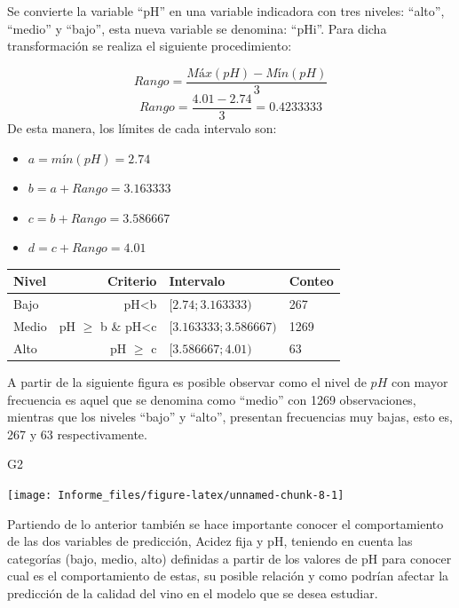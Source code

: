 \documentclass[
]{article}
\newenvironment{Shaded}{\begin{snugshade}}{\end{snugshade}}
\newcommand{\NormalTok}[1]{#1}
\providecommand{\tightlist}{%
  \setlength{\itemsep}{0pt}\setlength{\parskip}{0pt}}
\begin{document}
Se convierte la variable ``pH'' en una variable indicadora con tres
niveles: ``alto'', ``medio'' y ``bajo'', esta nueva variable se
denomina: ``pHi''. Para dicha transformación se realiza el siguiente
procedimiento:

\[Rango=\displaystyle\frac{Máx(pH)-Mín(pH)}{3}\]
\[Rango=\displaystyle\frac{4.01-2.74}{3}=0.4233333\] De esta manera, los
límites de cada intervalo son:

\begin{itemize}
\tightlist
\item
  \(a = mín(pH)=2.74\)
\item
  \(b = a + Rango=3.163333\)
\item
  \(c = b + Rango=3.586667\)
\item
  \(d = c + Rango=4.01\)
\end{itemize}

\begin{longtable}[]{@{}lrll@{}}
\toprule
Nivel & Criterio & Intervalo & Conteo\tabularnewline
\midrule
\endhead
Bajo & pH\textless b & \([2.74;3.163333)\) & 267\tabularnewline
Medio & pH \(\geq\) b \& pH\textless c & \([3.163333;3.586667)\) &
1269\tabularnewline
Alto & pH \(\geq\) c & \([3.586667;4.01)\) & 63\tabularnewline
\bottomrule
\end{longtable}

A partir de la siguiente figura es posible observar como el nivel de
\(pH\) con mayor frecuencia es aquel que se denomina como ``medio'' con
1269 observaciones, mientras que los niveles ``bajo'' y ``alto'',
presentan frecuencias muy bajas, esto es, 267 y 63 respectivamente.

\begin{Shaded}
\begin{Highlighting}[]
\NormalTok{G2}
\end{Highlighting}
\end{Shaded}

\begin{center}\texttt{[image: Informe\_files/figure-latex/unnamed-chunk-8-1]} \end{center}

Partiendo de lo anterior también se hace importante conocer el
comportamiento de las dos variables de predicción, Acidez fija y pH,
teniendo en cuenta las categorías (bajo, medio, alto) definidas a partir
de los valores de pH para conocer cual es el comportamiento de estas, su
posible relación y como podrían afectar la predicción de la calidad del
vino en el modelo que se desea estudiar.
\end{document}
